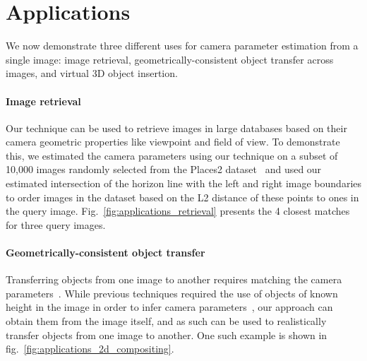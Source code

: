 \section{Applications}

We now demonstrate three different uses for camera parameter estimation from a single image: image retrieval, geometrically-consistent object transfer across images, and virtual 3D object insertion.

\paragraph{Image retrieval}

Our technique can be used to retrieve images in large databases based on their camera geometric properties like viewpoint and field of view. To demonstrate this, we estimated the camera parameters using our technique on a subset of 10,000 images randomly selected from the Places2 dataset~\cite{Zhou2017} and used our estimated intersection of the horizon line with the left and right image boundaries to order images in the dataset based on the L2 distance of these points to ones in the query image. Fig.~\ref{fig:applications_retrieval} presents the 4 closest matches for three query images.

\paragraph{Geometrically-consistent object transfer}

Transferring objects from one image to another requires matching the camera parameters~\cite{lalonde-siggraph-07}. While previous techniques required the use of objects of known height in the image in order to infer camera parameters~\cite{lalonde-siggraph-07}, our approach can obtain them from the image itself, and as such can be used to realistically transfer objects from one image to another. One such example is shown in fig.~\ref{fig:applications_2d_compositing}. 

